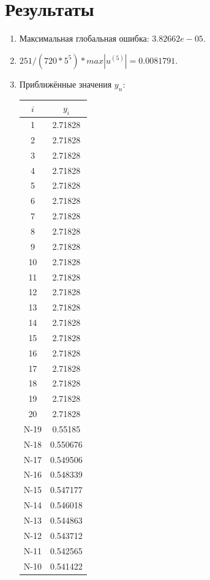\documentclass[10pt,a4paper,oneside,russian]{article}
\begin{document}
\section{Результаты}
\begin{enumerate}
  \item Максимальная глобальная ошибка: $3.82662e-05$.
  \item $251 / (720 * 5^5) * max|u^{(5)}| = 0.0081791$.
  \item Приближённые значения $y_n$:\\
  \begin{tabular}{|c|c|}
    \hline
    $i$ & $y_i$\\ \hline
    1&2.71828\\ \hline
    2&2.71828\\ \hline
    3&2.71828\\ \hline
    4&2.71828\\ \hline
    5&2.71828\\ \hline
    6&2.71828\\ \hline
    7&2.71828\\ \hline
    8&2.71828\\ \hline
    9&2.71828\\ \hline
    10&2.71828\\ \hline
    11&2.71828\\ \hline
    12&2.71828\\ \hline
    13&2.71828\\ \hline
    14&2.71828\\ \hline
    15&2.71828\\ \hline
    16&2.71828\\ \hline
    17&2.71828\\ \hline
    18&2.71828\\ \hline
    19&2.71828\\ \hline
    20&2.71828\\ \hline
    N-19&0.55185\\ \hline
    N-18&0.550676\\ \hline
    N-17&0.549506\\ \hline
    N-16&0.548339\\ \hline
    N-15&0.547177\\ \hline
    N-14&0.546018\\ \hline
    N-13&0.544863\\ \hline
    N-12&0.543712\\ \hline
    N-11&0.542565\\ \hline
    N-10&0.541422\\ \hline

\end{tabular}
\end{enumerate}
\end{document}
